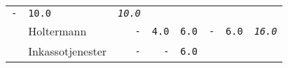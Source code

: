 \documentclass[11pt,A4paper,]{article}
\begin{document}
\begin{longtable}[]{@{}llrrrrrr@{}}
\begin{minipage}[t]{0.12\columnwidth}
\texttt{-}\strut
\end{minipage} & \begin{minipage}[t]{0.12\columnwidth}\raggedleft\strut
\texttt{10.0}\strut
\end{minipage} & \begin{minipage}[t]{0.12\columnwidth}\raggedleft\strut
\emph{\texttt{10.0}}\strut
\end{minipage}\tabularnewline
\begin{minipage}[t]{0.12\columnwidth}\raggedright\strut
\strut
\end{minipage} & \begin{minipage}[t]{0.12\columnwidth}\raggedright\strut
Holtermann\strut
\end{minipage} & \begin{minipage}[t]{0.12\columnwidth}\raggedleft\strut
\texttt{-}\strut
\end{minipage} & \begin{minipage}[t]{0.12\columnwidth}\raggedleft\strut
\texttt{4.0}\strut
\end{minipage} & \begin{minipage}[t]{0.12\columnwidth}\raggedleft\strut
\texttt{6.0}\strut
\end{minipage} & \begin{minipage}[t]{0.12\columnwidth}\raggedleft\strut
\texttt{-}\strut
\end{minipage} & \begin{minipage}[t]{0.12\columnwidth}\raggedleft\strut
\texttt{6.0}\strut
\end{minipage} & \begin{minipage}[t]{0.12\columnwidth}\raggedleft\strut
\emph{\texttt{16.0}}\strut
\end{minipage}\tabularnewline
\begin{minipage}[t]{0.12\columnwidth}\raggedright\strut
\strut
\end{minipage} & \begin{minipage}[t]{0.12\columnwidth}\raggedright\strut
Inkassotjenester\strut
\end{minipage} & \begin{minipage}[t]{0.12\columnwidth}\raggedleft\strut
\texttt{-}\strut
\end{minipage} & \begin{minipage}[t]{0.12\columnwidth}\raggedleft\strut
\texttt{-}\strut
\end{minipage} & \begin{minipage}[t]{0.12\columnwidth}\raggedleft\strut
\texttt{6.0}\strut
\end{minipage} & \begin{minipage}[t]{0.12\columnwidth}\raggedleft\strut

\end{minipage}
\end{longtable}
\end{document}
